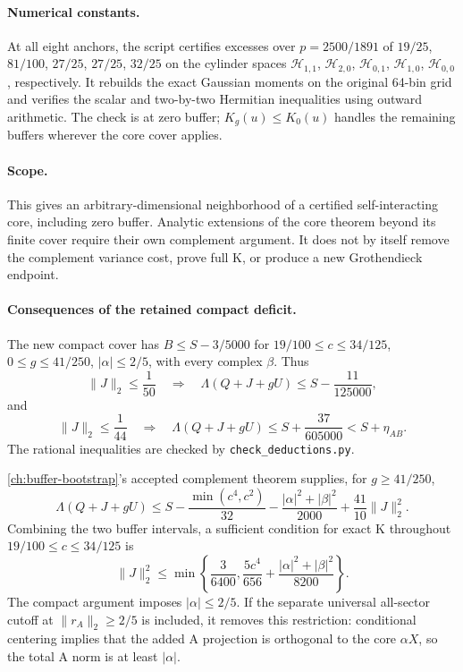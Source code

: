 \paragraph{Numerical constants.}
At all eight anchors, the script certifies excesses over $p=2500/1891$
of $19/25$, $81/100$, $27/25$, $27/25$, $32/25$ on the cylinder spaces
$\mathcal H_{1,1}$, $\mathcal H_{2,0}$, $\mathcal H_{0,1}$,
$\mathcal H_{1,0}$, $\mathcal H_{0,0}$, respectively. It rebuilds the
exact Gaussian moments on the original 64-bin grid and verifies the
scalar and two-by-two Hermitian inequalities using outward arithmetic.
The check is at zero buffer; $K_g(u)\le K_0(u)$ handles the remaining
buffers wherever the core cover applies.

\paragraph{Scope.}
This gives an arbitrary-dimensional neighborhood of a certified
self-interacting core, including zero buffer. Analytic extensions of the
core theorem beyond its finite cover require their own complement
argument. It does not by itself remove the complement variance cost,
prove full K, or produce a new Grothendieck endpoint.

\paragraph{Consequences of the retained compact deficit.}
The new compact cover has $B\le S-3/5000$ for
$19/100\le c\le34/125$, $0\le g\le41/250$,
$|\alpha|\le2/5$, with every complex $\beta$. Thus
\[
 \|J\|_2\le\frac1{50}
 \quad\Longrightarrow\quad
 \Lambda(Q+J+gU)\le S-\frac{11}{125000},
\]
and
\[
 \|J\|_2\le\frac1{44}
 \quad\Longrightarrow\quad
 \Lambda(Q+J+gU)\le S+\frac{37}{605000}<S+\eta_{AB}.
\]
The rational inequalities are checked by
\texttt{check\_deductions.py}.

\autoref{ch:buffer-bootstrap}'s accepted complement theorem supplies, for $g\ge41/250$,
\[
 \Lambda(Q+J+gU)\le S-\frac{\min(c^4,c^2)}{32}
 -\frac{|\alpha|^2+|\beta|^2}{2000}
 +\frac{41}{10}\|J\|_2^2.
\]
Combining the two buffer intervals, a sufficient condition for exact K
throughout $19/100\le c\le34/125$ is
\[
 \boxed{\|J\|_2^2\le
 \min\left\{\frac3{6400},\frac{5c^4}{656}
                      +\frac{|\alpha|^2+|\beta|^2}{8200}\right\}.}
\]
The compact argument imposes $|\alpha|\le2/5$. If the separate universal
all-sector cutoff at $\|r_A\|_2\ge2/5$ is included, it removes this
restriction: conditional centering implies that the added A projection
is orthogonal to the core $\alpha X$, so the total A norm is at least
$|\alpha|$.


